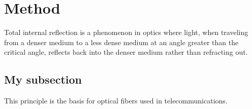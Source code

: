 \chapter{Method }

Total internal reflection is a phenomenon in optics where light, when traveling from a denser medium to a less dense medium at an angle greater than the critical angle, reflects back into the denser medium rather than refracting out. 

\section{My subsection}

This principle is the basis for optical fibers used in telecommunications.

\newpage
